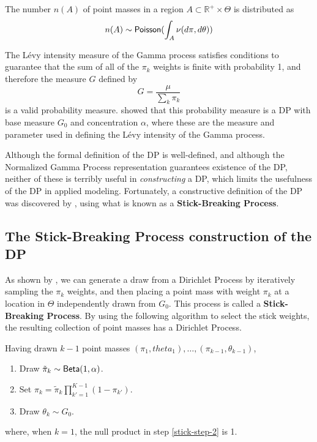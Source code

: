   The number $n(A)$ of point masses in a region $A \subset \mathbb{R}^+ \times \Theta$ is
  distributed as
  \begin{equation}
    \label{eq:9}
    n(A) \sim \mathsf{Poisson}(\int_A \nu(d\pi, d\theta))
  \end{equation}

  The L\'evy intensity measure of the Gamma process satisfies
  conditions to guarantee that the sum of all of the $\pi_k$
  weights is finite with probability 1, and therefore the measure $G$
  defined by
  \begin{equation}
    \label{eq:1}
    G = \frac{\mu}{\sum_k \pi_k}
  \end{equation}
  is a valid probability measure.  \citet{ferguson1973bayesian} showed
  that this probability measure is a DP with base measure $G_0$ and
  concentration $\alpha$, where
  these are the measure and parameter used in defining the L\'evy intensity of the
  Gamma process.

  Although the formal definition of the DP is well-defined, and
  although the Normalized Gamma Process representation guarantees
  existence of the DP, neither of these is terribly useful in {\em
    constructing} a DP, which limits the usefulness of the DP in
  applied modeling.  Fortunately, a constructive definition of the DP
  was discovered by \citet{sethuraman1994constructive}, using what is
  known as a {\bf Stick-Breaking Process}.

  \subsection{The Stick-Breaking Process construction of the DP}
  \label{sec:stick-break-proc}

  As shown by \citet{sethuraman1994constructive}, we can generate a
  draw from a Dirichlet Process by iteratively sampling the $\pi_k$
  weights, and then placing a point mass with weight $\pi_k$ at a
  location in $\Theta$ independently drawn from $G_0$.  This process
  is called a {\bf Stick-Breaking Process}.  By using the following
  algorithm to select the stick weights, the resulting collection of
  point masses has a Dirichlet Process.

  Having drawn $k-1$ point masses $(\pi_1, theta_1), \dots, (\pi_{k-1}, \theta_{k-1})$,
  \begin{enumerate}
  \item \label{stick-step-1} Draw $\tilde{\pi}_{k} \sim \mathsf{Beta}(1,\alpha)$.
  \item \label{stick-step-2} Set $\pi_k = \tilde{\pi}_k \prod_{k'=1}^{K-1}
    (1 - \pi_{k'})$.
  \item \label{stick-step-3} Draw $\theta_k \sim G_0$.
  \end{enumerate}
  where, when $k = 1$, the null product in step \ref{stick-step-2} is
  1.

